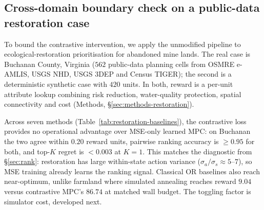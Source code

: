 \documentclass[11pt]{article}
\begin{document}
\subsection{Cross-domain boundary check on a public-data restoration case}\label{sec:cross-domain}

To bound the contrastive intervention, we apply the unmodified pipeline to ecological-restoration prioritisation for abandoned mine lands. The real case is Buchanan County, Virginia ($562$ public-data planning cells from OSMRE e-AMLIS, USGS NHD, USGS 3DEP and Census TIGER); the second is a deterministic synthetic case with $420$ units. In both, reward is a per-unit attribute lookup combining risk reduction, water-quality protection, spatial connectivity and cost (Methods, \S\ref{sec:methods-restoration}).

Across seven methods (Table~\ref{tab:restoration-baselines}), the contrastive loss provides no operational advantage over MSE-only learned MPC: on Buchanan the two agree within $0.20$ reward units, pairwise ranking accuracy is $\geq 0.95$ for both, and top-$K$ regret is $<0.003$ at $K{=}1$. This matches the diagnostic from \S\ref{sec:rank}: restoration has large within-state action variance ($\sigma_a/\sigma_s \approx 5$--$7$), so MSE training already learns the ranking signal. Classical OR baselines also reach near-optimum, unlike farmland where simulated annealing reaches reward $9.04$ versus contrastive MPC's $86.74$ at matched wall budget. The toggling factor is simulator cost, developed next.
\end{document}
